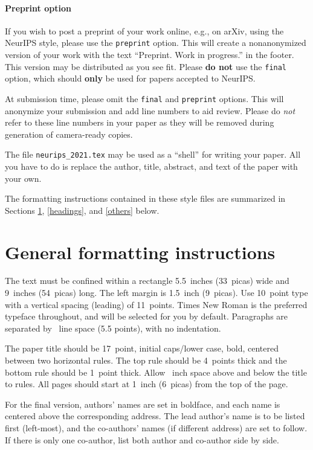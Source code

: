 \documentclass{article}
\begin{document}
\paragraph{Preprint option}
If you wish to post a preprint of your work online, e.g., on arXiv, using the
NeurIPS style, please use the \verb+preprint+ option. This will create a
nonanonymized version of your work with the text ``Preprint. Work in progress.''
in the footer. This version may be distributed as you see fit. Please \textbf{do
  not} use the \verb+final+ option, which should \textbf{only} be used for
papers accepted to NeurIPS.

At submission time, please omit the \verb+final+ and \verb+preprint+
options. This will anonymize your submission and add line numbers to aid
review. Please do \emph{not} refer to these line numbers in your paper as they
will be removed during generation of camera-ready copies.

The file \verb+neurips_2021.tex+ may be used as a ``shell'' for writing your
paper. All you have to do is replace the author, title, abstract, and text of
the paper with your own.

The formatting instructions contained in these style files are summarized in
Sections \ref{gen_inst}, \ref{headings}, and \ref{others} below.

\section{General formatting instructions}
\label{gen_inst}

The text must be confined within a rectangle 5.5~inches (33~picas) wide and
9~inches (54~picas) long. The left margin is 1.5~inch (9~picas).  Use 10~point
type with a vertical spacing (leading) of 11~points.  Times New Roman is the
preferred typeface throughout, and will be selected for you by default.
Paragraphs are separated by ~line space (5.5 points), with no
indentation.

The paper title should be 17~point, initial caps/lower case, bold, centered
between two horizontal rules. The top rule should be 4~points thick and the
bottom rule should be 1~point thick. Allow ~inch space above and
below the title to rules. All pages should start at 1~inch (6~picas) from the
top of the page.

For the final version, authors' names are set in boldface, and each name is
centered above the corresponding address. The lead author's name is to be listed
first (left-most), and the co-authors' names (if different address) are set to
follow. If there is only one co-author, list both author and co-author side by
side.
\end{document}
